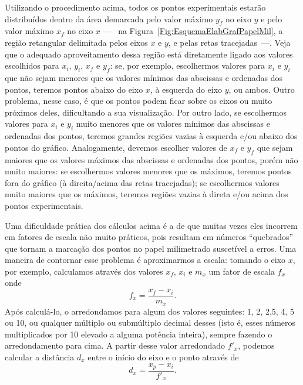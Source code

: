 Utilizando o procedimento acima, todos os pontos experimentais estarão distribuídos dentro da área demarcada pelo valor máximo $y_f$ no eixo $y$ e pelo valor máximo $x_f$ no eixo $x$ ---~ na Figura~\ref{Fig:EsquemaElabGrafPapelMil}, a região retangular delimitada pelos eixos $x$ e $y$, e pelas retas tracejadas~---. Veja que o adequado aproveitamento dessa região está diretamente ligado aos valores escolhidos para $x_i$, $y_i$, $x_f$ e $y_f$: se, por exemplo, escolhermos valores para $x_i$ e $y_i$ que não sejam menores que os valores mínimos das abscissas e ordenadas dos pontos, teremos pontos abaixo do eixo $x$, à esquerda do eixo $y$, ou ambos. Outro problema, nesse caso, é que os pontos podem ficar sobre os eixos ou muito próximos deles, dificultando a sua visualização. Por outro lado, se escolhermos valores para $x_i$ e $y_i$ muito menores que os valores mínimos das abscissas e ordenadas dos pontos, teremos grandes regiões vazias à esquerda e/ou abaixo dos pontos do gráfico. Analogamente, devemos escolher valores de $x_f$ e $y_f$ que sejam maiores que os valores máximos das abscissas e ordenadas dos pontos, porém não muito maiores: se escolhermos valores menores que os máximos, teremos pontos fora do gráfico (à direita/acima das retas tracejadas); se escolhermos valores muito maiores que os máximos, teremos regiões vazias à direta e/ou acima dos pontos experimentais. 

Uma dificuldade prática dos cálculos acima é a de que muitas vezes eles incorrem em fatores de escala não muito práticos, pois resultam em números ``quebrados'' que tornam a marcação dos pontos no papel milimetrado suscetível a erros. Uma maneira de contornar esse problema é aproximarmos a escala: tomando o eixo $x$, por exemplo, calculamos através dos valores $x_f$, $x_i$ e $m_x$ um fator de escala $f_x$ onde
		\begin{equation}
			f_x = \frac{x_f - x_i}{m_x}.
		\end{equation}
Após calculá-lo, o arredondamos para algum dos valores seguintes: 1, 2, 2,5, 4, 5 ou 10, ou qualquer múltiplo ou submúltiplo decimal desses (isto é, esses números multiplicados por 10 elevado a alguma potência inteira), sempre fazendo o arredondamento para cima. A partir desse valor arredondado $f'_x$, podemos calcular a distância $d_x$ entre o início do eixo e o ponto através de
		\begin{equation}
			d_x = \frac{x_p - x_i}{f'_x}.
		\end{equation}


